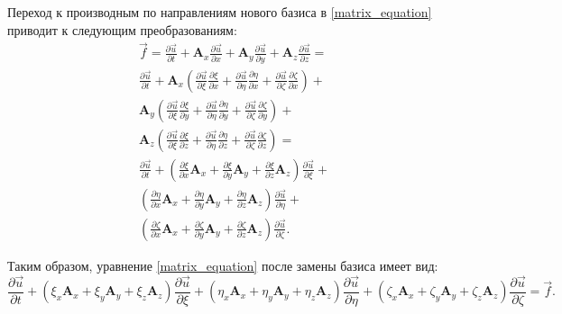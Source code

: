 Переход к производным по направлениям нового базиса в \ref{matrix_equation} приводит к следующим преобразованиям:
\begin{eqnarray}
\nonumber
\vec{f} = \frac{\partial\vec{u}}{\partial{t}} + 
\mathbf{A}_x\frac{\partial\vec{u}}{\partial{x}} + 
\mathbf{A}_y\frac{\partial\vec{u}}{\partial{y}} + 
\mathbf{A}_z\frac{\partial\vec{u}}{\partial{z}} =
\nonumber\\
\frac{\partial\vec{u}}{\partial{t}} + 
\mathbf{A}_x (\frac{\partial\vec{u}}{\partial{\xi}}\frac{\partial{\xi}}{\partial{x}} + 
\frac{\partial\vec{u}}{\partial{\eta}}\frac{\partial{\eta}}{\partial{x}} + 
\frac{\partial\vec{u}}{\partial{\zeta}}\frac{\partial{\zeta}}{\partial{x}} ) + 
\nonumber\\
\mathbf{A}_y (\frac{\partial\vec{u}}{\partial{\xi}}\frac{\partial{\xi}}{\partial{y}} + 
\frac{\partial\vec{u}}{\partial{\eta}}\frac{\partial{\eta}}{\partial{y}} + 
\frac{\partial\vec{u}}{\partial{\zeta}}\frac{\partial{\zeta}}{\partial{y}} ) + 
\nonumber\\
\mathbf{A}_z (\frac{\partial\vec{u}}{\partial{\xi}}\frac{\partial{\xi}}{\partial{z}} + 
\frac{\partial\vec{u}}{\partial{\eta}}\frac{\partial{\eta}}{\partial{z}} + 
\frac{\partial\vec{u}}{\partial{\zeta}}\frac{\partial{\zeta}}{\partial{z}} ) = 
\nonumber\\
\frac{\partial\vec{u}}{\partial{t}} + 
( \frac{\partial{\xi}}{\partial{x}} \mathbf{A}_x  + 
\frac{\partial{\xi}}{\partial{y}} \mathbf{A}_y + 
\frac{\partial{\xi}}{\partial{z}} \mathbf{A}_z ) \frac{\partial\vec{u}}{\partial{\xi}} + 
\nonumber\\
( \frac{\partial{\eta}}{\partial{x}} \mathbf{A}_x + 
\frac{\partial{\eta}}{\partial{y}} \mathbf{A}_y + 
\frac{\partial{\eta}}{\partial{z}} \mathbf{A}_z ) \frac{\partial\vec{u}}{\partial{\eta}} + 
\nonumber\\
( \frac{\partial{\zeta}}{\partial{x}} \mathbf{A}_x  + 
\frac{\partial{\zeta}}{\partial{y}} \mathbf{A}_y + 
\frac{\partial{\zeta}}{\partial{z}} \mathbf{A}_z ) \frac{\partial\vec{u}}{\partial{\zeta}}.
\end{eqnarray}

Таким образом, уравнение \ref{matrix_equation} после замены базиса имеет вид:
\begin{equation}
\label{matrix_equation_generalized}
\frac{\partial\vec{u}}{\partial{t}} + 
( \xi_x \mathbf{A}_x  + \xi_y \mathbf{A}_y + \xi_z \mathbf{A}_z ) \frac{\partial\vec{u}}{\partial{\xi}} + 
( \eta_x \mathbf{A}_x + \eta_y \mathbf{A}_y + \eta_z \mathbf{A}_z ) \frac{\partial\vec{u}}{\partial{\eta}} + 
( \zeta_x \mathbf{A}_x  + \zeta_y \mathbf{A}_y + \zeta_z \mathbf{A}_z ) \frac{\partial\vec{u}}{\partial{\zeta}} = \vec f.
\end{equation}

